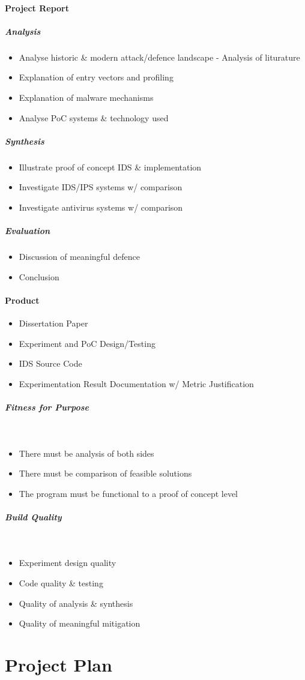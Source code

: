 \paragraph{Project Report}
\subparagraph{Analysis}
\begin{itemize}
	\item Analyse historic \& modern attack/defence landscape - Analysis of liturature
	\item Explanation of entry vectors and profiling
	\item Explanation of malware mechanisms
	\item Analyse PoC systems \& technology used 
\end{itemize}

\subparagraph{Synthesis}
\begin{itemize}
	\item Illustrate proof of concept IDS \& implementation
	\item Investigate IDS/IPS systems w/ comparison
	\item Investigate antivirus systems w/ comparison
\end{itemize}

\subparagraph{Evaluation}
\begin{itemize}
	\item Discussion of meaningful defence
	\item Conclusion
\end{itemize}

\paragraph{Product}
\begin{itemize}
	\item Dissertation Paper
	\item Experiment and PoC Design/Testing
	\item IDS Source Code
	\item Experimentation Result Documentation w/ Metric Justification
\end{itemize}

\subparagraph{Fitness for Purpose}~
\begin{itemize}
	\item There must be analysis of both sides
	\item There must be comparison of feasible solutions
	\item The program must be functional to a proof of concept level
\end{itemize}

\subparagraph{Build Quality}~
\begin{itemize}
	\item Experiment design quality
	\item Code quality & testing
	\item Quality of analysis & synthesis
	\item Quality of meaningful mitigation
\end{itemize}

\clearpage

\section{Project Plan}
\noindent
{}
